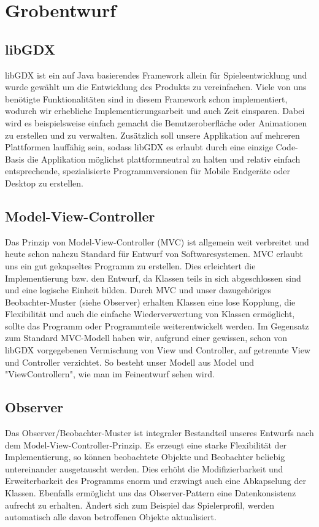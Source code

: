 \section{Grobentwurf}

\subsection{libGDX}
libGDX ist ein auf Java basierendes Framework allein für Spieleentwicklung und wurde gewählt um die Entwicklung des Produkts zu vereinfachen.
Viele von uns benötigte Funktionalitäten sind in diesem Framework schon implementiert, wodurch wir erhebliche Implementierungsarbeit und auch Zeit einsparen.
Dabei wird es beispielsweise einfach gemacht die Benutzeroberfläche oder Animationen zu erstellen und zu verwalten.
Zusätzlich soll unsere Applikation auf mehreren Plattformen lauffähig sein, sodass libGDX es erlaubt durch eine einzige Code-Basis die Applikation möglichst plattformneutral zu halten 
und relativ einfach entsprechende, spezialisierte Programmversionen für Mobile Endgeräte oder Desktop zu erstellen.

\subsection{Model-View-Controller}
Das Prinzip von Model-View-Controller (MVC) ist allgemein weit verbreitet und heute schon nahezu Standard für Entwurf von Softwaresystemen. 
MVC erlaubt uns ein gut gekapseltes Programm zu erstellen. Dies erleichtert die Implementierung bzw. den Entwurf, da Klassen teils in sich abgeschlossen sind
und eine logische Einheit bilden. Durch MVC und unser dazugehöriges Beobachter-Muster (siehe Observer) erhalten Klassen eine lose Kopplung,
die Flexibilität und auch die einfache Wiederverwertung von Klassen ermöglicht, sollte das Programm oder Programmteile weiterentwickelt werden.
Im Gegensatz zum Standard MVC-Modell haben wir, aufgrund einer gewissen, schon von libGDX vorgegebenen Vermischung von View und Controller,
auf getrennte View und Controller verzichtet. So besteht unser Modell aus Model und "ViewControllern", wie man im Feinentwurf sehen wird.

\subsection{Observer}
Das Observer/Beobachter-Muster ist integraler Bestandteil unseres Entwurfs nach dem Model-View-Controller-Prinzip.
Es erzeugt eine starke Flexibilität der Implementierung, so können beobachtete Objekte und Beobachter beliebig untereinander ausgetauscht werden.
Dies erhöht die Modifizierbarkeit und Erweiterbarkeit des Programms enorm und erzwingt auch eine Abkapselung der Klassen.
Ebenfalls ermöglicht uns das Observer-Pattern eine Datenkonsistenz aufrecht zu erhalten. Ändert sich zum Beispiel das Spielerprofil, 
werden automatisch alle davon betroffenen Objekte aktualisiert.

